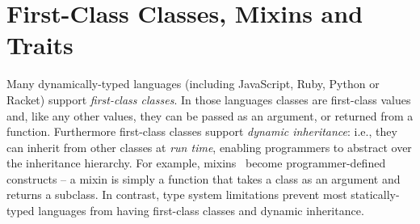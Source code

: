 

\section{First-Class Classes, Mixins and Traits}

Many dynamically-typed languages (including JavaScript, Ruby, Python or Racket)
support \emph{first-class classes}. In those languages classes are first-class
values and, like any other values, they can be passed as an argument, or
returned from a function. Furthermore first-class classes support \emph{dynamic
  inheritance}: i.e., they can inherit from other classes at \emph{run time},
enabling programmers to abstract over the inheritance hierarchy. For example,
mixins~\citep{bracha1990mixin} become programmer-defined constructs -- a mixin is
simply a function that takes a class as an argument and returns a subclass. In
contrast, type system limitations prevent most statically-typed languages from
having first-class classes and dynamic inheritance.

